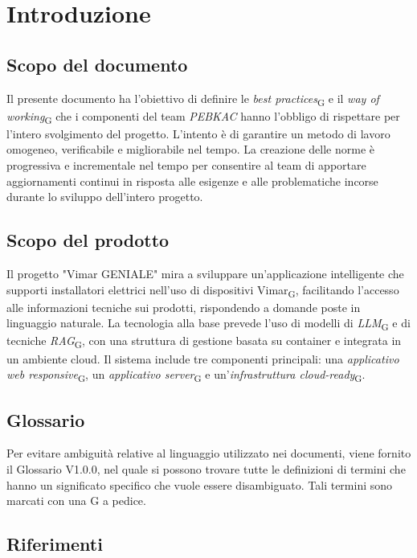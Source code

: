 \section{Introduzione}
\subsection{Scopo del documento}
Il presente documento ha l’obiettivo di definire le \textit{best practices}\textsubscript{G}  e il \textit{way of working}\textsubscript{G} che i componenti del team \textit{PEBKAC} hanno l’obbligo di rispettare per l’intero svolgimento del progetto. L'intento è di garantire un metodo di lavoro omogeneo, verificabile
e migliorabile nel tempo. La creazione delle norme è progressiva e incrementale nel tempo per consentire al team di apportare aggiornamenti continui in risposta alle esigenze e alle problematiche incorse durante lo sviluppo dell'intero progetto.

\subsection{Scopo del prodotto}
Il progetto "Vimar GENIALE" mira a sviluppare un'applicazione intelligente che supporti installatori elettrici nell'uso di dispositivi Vimar\textsubscript{G}, facilitando l'accesso alle informazioni tecniche sui prodotti, rispondendo a domande poste in linguaggio naturale.
La tecnologia alla base prevede l'uso di modelli di \textit{LLM}\textsubscript{G} e di tecniche \textit{RAG}\textsubscript{G}, con una struttura di gestione basata su container e integrata in un ambiente cloud.
Il sistema include tre componenti principali: una \textit{applicativo web responsive}\textsubscript{G}, un \textit{applicativo server}\textsubscript{G} e un'\textit{infrastruttura cloud-ready}\textsubscript{G}. 
\subsection{Glossario}
Per evitare ambiguità relative al linguaggio utilizzato nei documenti, viene fornito il Glossario V1.0.0, nel quale si possono trovare tutte le definizioni di termini che hanno un significato specifico che vuole essere disambiguato. Tali termini sono marcati con una G a pedice. 
\subsection{Riferimenti}
